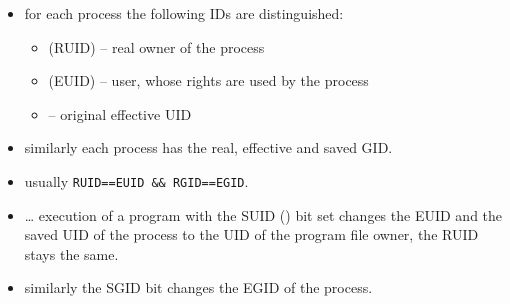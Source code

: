 \begin{slide}
\begin{itemize}
\item for each process the following IDs are distinguished:
    \begin{itemize}
    \item {} (RUID) -- real owner of the process
    \item {} (EUID) -- user, whose rights are used by the
process
    \item {} -- original effective UID
    \end{itemize}
\item similarly each process has the real, effective and saved GID.
\item usually \texttt{RUID==EUID \&\& RGID==EGID}.
\item {} \dots{} execution of a program with
the SUID () bit set changes the EUID and the saved UID of the process
to the UID of the program file owner, the RUID stays the same.
\item similarly the SGID bit changes the EGID of the process.
\end{itemize}
\end{slide}


